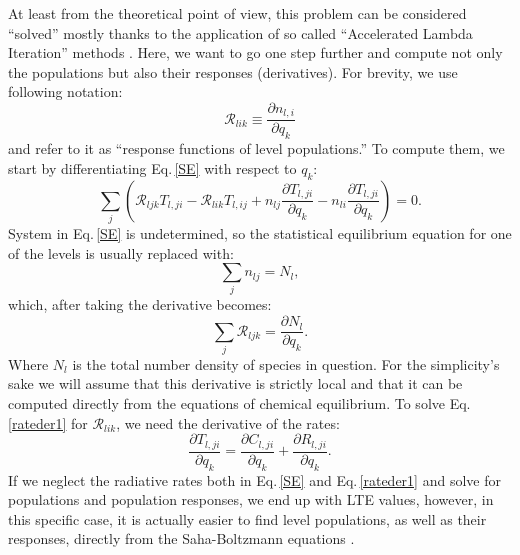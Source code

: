 \documentclass[referee]{aa}
\begin{document}
At least from the theoretical point of view, this problem can be considered ``solved'' mostly thanks to the application of so called ``Accelerated Lambda Iteration'' methods \citep[for an insightful review see][]{Hubeny03}.  Here, we want to go one step further and compute not only the populations but also their responses (derivatives). For brevity, we use following notation:
\begin{equation}
 {\mathcal R}_{lik} \equiv \frac{\partial n_{l,i}}{\partial q_k}
\end{equation}
and refer to it as ``response functions of level populations.'' To compute them, we start by differentiating Eq.\,\ref{SE} with respect to $q_k$:
\begin{equation}
 \sum_j \left ({\mathcal R}_{ljk} T_{l,ji} - {\mathcal R}_{lik} T_{l,ij} + n_{lj} \frac{\partial T_{l,ji}}{\partial q_k} - n_{li} \frac{\partial T_{l,ji}}{\partial q_k} \right ) = 0.
 \label{rateder1}
\end{equation}
System in Eq.\,\ref{SE} is undetermined, so the statistical equilibrium equation for one of the levels is usually replaced with:
\begin{equation}
 \sum_j n_{lj} = N_l,
\end{equation}
which, after taking the derivative becomes:
\begin{equation}
 \sum_j {\mathcal R}_{ljk} = \frac{\partial N_l}{\partial q_k}.
\end{equation}
Where $N_l$ is the total number density of species in question. For the simplicity's sake we will assume that this derivative is strictly local and that it can be computed directly from the equations of chemical equilibrium. To solve Eq.\,\ref{rateder1} for $\mathcal{R}_{lik}$, we need the derivative of the rates:
\begin{equation}
\frac{\partial T_{l,ji}}{\partial q_k} = \frac{\partial C_{l,ji}}{\partial q_k} + \frac{\partial R_{l,ji}}{\partial q_k}.
\label{rateder2}
\end{equation}
If we neglect the radiative rates both in Eq.\,\ref{SE} and Eq.\,\ref{rateder1} and solve for populations and population responses, we end up with LTE values, however, in this specific case, it is actually easier to find level populations, as well as their responses, directly from the Saha-Boltzmann equations \citep[see, e.g.][]{SIR}. 
\end{document}
